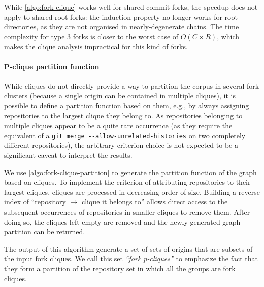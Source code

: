 While \cref{algo:fork-clique} works well for shared commit forks, the
speedup does not apply to shared root forks: the induction property no longer
works for root directories, as they are not organised in nearly-degenerate
chains. The time complexity for type 3 forks is closer to the worst case of
$O(C \times R)$, which makes the clique analysis impractical for this
kind of forks.

\paragraph{P-clique partition function}
While cliques do not directly provide a way to partition the corpus in several
fork clusters (because a single origin can be contained in multiple cliques),
it is possible to define a partition function based on them, e.g., by always
assigning repositories to the largest clique they belong to. As repositories
belonging to multiple cliques appear to be a quite rare occurrence (as they
require the equivalent of a \texttt{git merge -{}-allow-unrelated-histories} on
two completely different repositories), the arbitrary criterion choice is not
expected to be a significant caveat to interpret the results.

We use \cref{algo:fork-clique-partition} to generate the partition function of
the graph based on cliques. To implement the criterion of attributing
repositories to their largest cliques, cliques are processed in decreasing
order of size. Building a reverse index of ``repository $\rightarrow$ clique it
belongs to'' allows direct access to the subsequent occurrences of repositories
in smaller cliques to remove them. After doing so, the cliques left empty are
removed and the newly generated graph partition can be returned.

The output of this algorithm generate a set of sets of origins that are subsets
of the input fork cliques. We call this set \emph{``fork p-cliques''} to
emphasize the fact that they form a partition of the repository set in which
all the groups are fork cliques.


